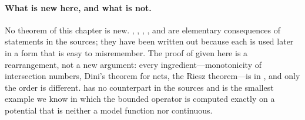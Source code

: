 \paragraph{What is new here, and what is not.}
No theorem of this chapter is new.  ,
, ,
,
 and
 are elementary consequences of
statements in the sources; they have been written out because each is used
later in a form that is easy to misremember.  The proof of
 given here is a rearrangement, not a new
argument: every ingredient---monotonicity of intersection numbers, Dini's
theorem for nets, the Riesz theorem---is in \cite{BFJ15}, and only the order
is different.   has no counterpart in the sources
and is the smallest example we know in which the bounded operator is computed
exactly on a potential that is neither a model function nor continuous.
